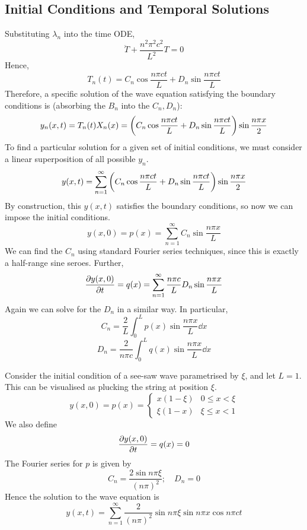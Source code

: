 \subsection{Initial Conditions and Temporal Solutions}
Substituting \( \lambda_n \) into the time ODE,
\[
	\ddot T + \frac{n^2 \pi^2 c^2}{L^2}T = 0
\]
Hence,
\[
	T_n(t) = C_n \cos \frac{n \pi c t}{L} + D_n \sin \frac{n \pi c t}{L}
\]
Therefore, a specific solution of the wave equation satisfying the boundary conditions is (absorbing the \( B_n \) into the \( C_n, D_n \)):
\[
	y_n(x,t) = T_n(t) X_n(x) = \qty(C_n \cos \frac{n \pi c t}{L} + D_n \sin \frac{n \pi c t}{L}) \sin \frac{n \pi x}{2}
\]
To find a particular solution for a given set of initial conditions, we must consider a linear superposition of all possible \( y_n \).
\[
	y(x,t) = \sum_{n=1}^\infty \qty(C_n \cos \frac{n \pi c t}{L} + D_n \sin \frac{n \pi c t}{L}) \sin \frac{n \pi x}{2}
\]
By construction, this \( y(x,t) \) satisfies the boundary conditions, so now we can impose the initial conditions.
\[
	y(x,0) = p(x) = \sum_{n=1}^\infty C_n \sin \frac{n \pi x}{L}
\]
We can find the \( C_n \) using standard Fourier series techniques, since this is exactly a half-range sine seroes.
Further,
\[
	\pdv{y(x,0)}{t} = q(x) = \sum_{n=1}^\infty \frac{n \pi c}{L} D_n \sin \frac{n \pi x}{L}
\]
Again we can solve for the \( D_n \) in a similar way.
In particular,
\[
	C_n = \frac{2}{L} \int_0^L p(x) \sin \frac{n \pi x}{L} \dd{x}
\]
\[
	D_n = \frac{2}{n \pi c} \int_0^L q(x) \sin \frac{n \pi x}{L} \dd{x}
\]
\begin{example}
	Consider the initial condition of a see-saw wave parametrised by \( \xi \), and let \( L = 1 \).
	This can be visualised as plucking the string at position \( \xi \).
	\[
		y(x,0) = p(x) = \begin{cases}
			x(1-\xi) & 0 \leq x < \xi \\
			\xi(1-x) & \xi \leq x < 1
		\end{cases}
	\]
	We also define
	\[
		\pdv{y(x,0)}{t} = q(x) = 0
	\]
	The Fourier series for \( p \) is given by
	\[
		C_n = \frac{2 \sin n \pi \xi}{(n \pi)^2};\quad D_n = 0
	\]
	Hence the solution to the wave equation is
	\[
		y(x,t) = \sum_{n=1}^\infty \frac{2}{(n \pi)^2} \sin n \pi \xi \sin n \pi x \cos n \pi c t
	\]
\end{example}

